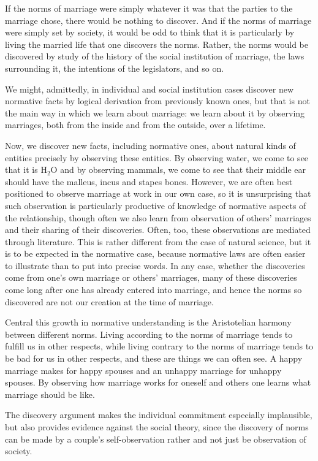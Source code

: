 If the norms of marriage were simply whatever it was that the parties to the marriage chose, there would be nothing to discover.
And if the norms of marriage were simply set by society, it would be odd to think that it is particularly by living the married life that
one discovers the norms. Rather, the norms would be discovered by study of the history of the social institution of marriage,
the laws surrounding it, the intentions of the legislators, and so on.

We might, admittedly, in individual and social institution cases discover
new normative facts by logical derivation from previously known ones, but that is not the main way in which we learn about marriage:
we learn about it by observing marriages, both from the inside and from the outside, over a lifetime.

Now, we discover new facts, including normative ones, about natural kinds of entities precisely by observing these entities. By observing water,
we come to see that it is H$_2$O and by observing mammals, we come to see that their middle ear should have the malleus, incus and stapes bones. However, we are often best positioned to observe marriage at work in our own case, so it 
is unsurprising that such observation is particularly productive of knowledge of normative aspects of the relationship,
though often we also learn from observation of others' marriages and their sharing of their discoveries. Often, too,
these observations are mediated through literature. This is rather different from the case of natural science, but it is
to be expected in the normative case, because normative laws are often easier to illustrate than to put into precise
words. In any case, whether the discoveries come from one's own marriage or others' marriages, many of these discoveries
come long after one has already entered into marriage, and hence the norms so discovered are not our creation at
the time of marriage.

Central this growth in normative understanding is the Aristotelian harmony between different norms. Living according to the norms of marriage tends to fulfill us in other respects,
while living contrary to the norms of marriage tends to be bad for us in other respects, and these are things we can often see. A happy marriage makes for
happy spouses and an unhappy marriage for unhappy spouses. By observing how marriage works for oneself and others
one learns what marriage should be like.

The discovery argument makes the individual commitment especially implausible, but also provides evidence against
the social theory, since the discovery of norms can be made by a couple's self-observation rather and not just be
observation of society.

